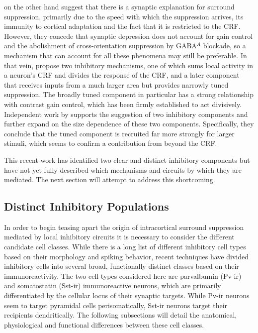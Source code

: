 \cite{Carandini2002} on the other hand suggest that there is a
synaptic explanation for surround suppression, primarily due to the
speed with which the suppression arrives, its immunity to cortical
adaptation and the fact that it is restricted to the CRF. However,
they concede that synaptic depression does not account for gain
control and the abolishment of cross-orientation suppression by
GABA$^{A}$ blockade, so a mechanism that can account for all these
phenomena may still be preferable. In that vein, \cite{Webb2005}
propose two inhibitory mechanisms, one of which sums local activity in
a neuron's CRF and divides the response of the CRF, and a later
component that receives inputs from a much larger area but provides
narrowly tuned suppression. The broadly tuned component in particular
has a strong relationship with contrast gain control, which has been
firmly established to act divisively. Independent work by
\cite{Xing2005} supports the suggestion of two inhibitory components
and further expand on the size dependence of these two
components. Specifically, they conclude that the tuned component is
recruited far more strongly for larger stimuli, which seems to confirm
a contribution from beyond the CRF.

This recent work has identified two clear and distinct inhibitory
components but have not yet fully described which mechanisms and
circuits by which they are mediated.  The next section will attempt to
address this shortcoming.

\subsection{Distinct Inhibitory Populations} \label{InhibitoryBackground}

In order to begin teasing apart the origin of intracortical surround
suppression mediated by local inhibitory circuits it is necessary to
consider the different candidate cell classes. While there is a long
list of different inhibitory cell types based on their morphology and
spiking behavior, recent techniques have divided inhibitory cells into
several broad, functionally distinct classes based on their
immunoreactivity. The two cell types considered here are parvalbumin
(Pv-ir) and somatostatin (Sst-ir) immunoreactive neurons, which are
primarily differentiated by the cellular locus of their synaptic
targets. While Pv-ir neurons seem to target pyramidal cells
perisomatically, Sst-ir neurons target their recipients
dendritically. The following subsections will detail the anatomical,
physiological and functional differences between these cell classes.

